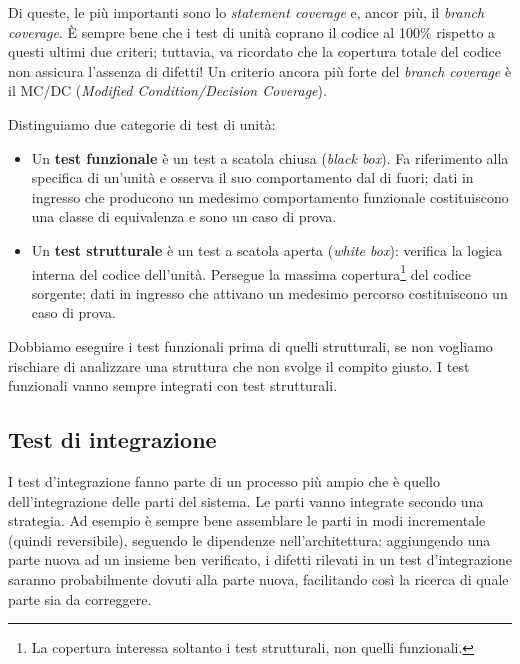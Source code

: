 \documentclass[a4paper]{article}
\begin{document}
		
Di queste, le più importanti sono lo \emph{statement coverage} e, ancor più, il \emph{branch coverage}. È sempre bene che i test di unità coprano il codice al 100\% rispetto a questi ultimi due criteri; tuttavia, va ricordato che la copertura totale del codice non assicura l'assenza di difetti! Un criterio ancora più forte del \emph{branch coverage} è il MC/DC (\emph{Modified Condition/Decision Coverage}).
		
Distinguiamo due categorie di test di unità:
		
	\begin{itemize}
		
			
	\item Un \textbf{test funzionale} è un test a scatola chiusa (\emph{black box}). Fa riferimento alla specifica di un'unità e osserva il suo comportamento dal di fuori; dati in ingresso che producono un medesimo comportamento funzionale costituiscono una classe di equivalenza e sono un caso di prova.
			
	\item Un \textbf{test strutturale} è un test a scatola aperta (\emph{white box}): verifica la logica interna del codice dell'unità. Persegue la massima copertura\footnote{La copertura interessa soltanto i test strutturali, non quelli funzionali.} del codice sorgente; dati in ingresso che attivano un medesimo percorso costituiscono un caso di prova.
		
	\end{itemize}

		
Dobbiamo eseguire i test funzionali prima di quelli strutturali, se non vogliamo rischiare di analizzare una struttura che non svolge il compito giusto. I test funzionali vanno sempre integrati con test strutturali.

		
	\subsection{Test di integrazione}

		
I test d'integrazione fanno parte di un processo più ampio che è quello dell'integrazione delle parti del sistema. Le parti vanno integrate secondo una strategia. Ad esempio è sempre bene assemblare le parti in modi incrementale (quindi reversibile), seguendo le dipendenze nell'architettura: aggiungendo una parte nuova ad un insieme ben verificato, i difetti rilevati in un test d'integrazione saranno probabilmente dovuti alla parte nuova, facilitando così la ricerca di quale parte sia da correggere.
		
\end{document}
